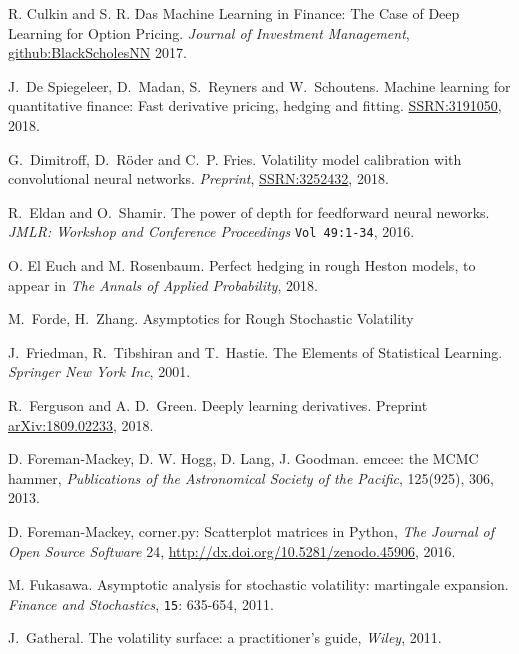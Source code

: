 \documentclass{article}
\theoremstyle{remark}
\begin{document}
\begin{thebibliography}{99}
R. Culkin and S. R. Das 
Machine Learning in Finance: The Case of Deep Learning for Option Pricing. 
\textit{Journal of Investment Management}, \href{https:srdas.github.io/Papers/BlackScholesNN.pdf}{github:BlackScholesNN} 2017.

 J.~De Spiegeleer, D.~Madan, S.~Reyners and W.~Schoutens. Machine learning for quantitative finance:
Fast derivative pricing, hedging and fitting. \href{https://papers.ssrn.com/sol3/papers.cfm?abstract_id=3191050}{SSRN:3191050}, 2018.

 G.~Dimitroff, D.~R\"oder and C.~P. Fries. Volatility model calibration with convolutional neural networks. \textit{Preprint}, \href{https://papers.ssrn.com/sol3/papers.cfm?abstract_id=3252432}{SSRN:3252432}, 2018.

R.~Eldan and O.~Shamir. The power of depth for feedforward neural neworks. \textit{JMLR: Workshop and Conference Proceedings} {\tt Vol 49:1-34}, 2016.

O. El Euch and M. Rosenbaum.
Perfect hedging in rough Heston models, to appear in
\textit{The Annals of Applied Probability}, 2018.

 M.~Forde, H.~Zhang. Asymptotics for Rough Stochastic Volatility

J.~Friedman, R.~Tibshiran and  T.~Hastie. The Elements of Statistical Learning. \textit{Springer New York Inc}, 2001.

 R.~Ferguson and A. D.~Green. Deeply learning derivatives.
  Preprint \href{https://arxiv.org/abs/1809.02233}{arXiv:1809.02233}, 2018.

 D. Foreman-Mackey, D. W. Hogg, D. Lang, J. Goodman.
  emcee: the MCMC hammer, \emph{Publications of the Astronomical Society of
    the Pacific}, 125(925), 306, 2013.

 D. Foreman-Mackey, corner.py: Scatterplot matrices in Python,
  \emph{The Journal of Open Source Software} 24,
  \url{http://dx.doi.org/10.5281/zenodo.45906}, 2016.

M. Fukasawa.
Asymptotic analysis for stochastic volatility: martingale expansion.
\textit{Finance and Stochastics}, {\tt 15}: 635-654, 2011.

 J.~Gatheral. The volatility surface: a practitioner's guide,
\textit{Wiley}, 2011.


\end{thebibliography}
\end{document}
